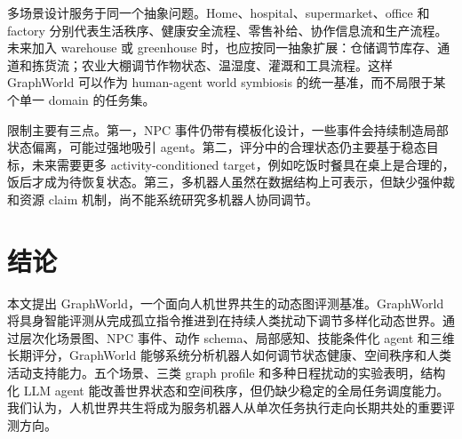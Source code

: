 \documentclass[journal]{IEEEtran}
\begin{document}
多场景设计服务于同一个抽象问题。Home、hospital、supermarket、office 和 factory 分别代表生活秩序、健康安全流程、零售补给、协作信息流和生产流程。未来加入 warehouse 或 greenhouse 时，也应按同一抽象扩展：仓储调节库存、通道和拣货流；农业大棚调节作物状态、温湿度、灌溉和工具流程。这样 GraphWorld 可以作为 human-agent world symbiosis 的统一基准，而不局限于某个单一 domain 的任务集。

限制主要有三点。第一，NPC 事件仍带有模板化设计，一些事件会持续制造局部状态偏离，可能过强地吸引 agent。第二，评分中的合理状态仍主要基于稳态目标，未来需要更多 activity-conditioned target，例如吃饭时餐具在桌上是合理的，饭后才成为待恢复状态。第三，多机器人虽然在数据结构上可表示，但缺少强仲裁和资源 claim 机制，尚不能系统研究多机器人协同调节。

\section{结论}
本文提出 GraphWorld，一个面向人机世界共生的动态图评测基准。GraphWorld 将具身智能评测从完成孤立指令推进到在持续人类扰动下调节多样化动态世界。通过层次化场景图、NPC 事件、动作 schema、局部感知、技能条件化 agent 和三维长期评分，GraphWorld 能够系统分析机器人如何调节状态健康、空间秩序和人类活动支持能力。五个场景、三类 graph profile 和多种日程扰动的实验表明，结构化 LLM agent 能改善世界状态和空间秩序，但仍缺少稳定的全局任务调度能力。我们认为，人机世界共生将成为服务机器人从单次任务执行走向长期共处的重要评测方向。



\end{document}
